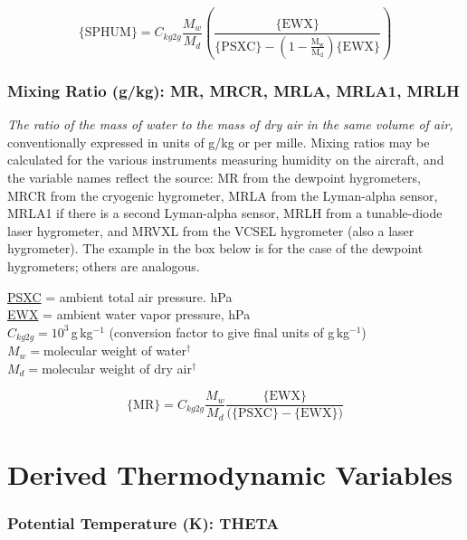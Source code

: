 \documentclass[
]{book}
\begin{document}
\begin{equation}
\mathrm{\{SPHUM\}} = C_{kg2g}\frac{M_{w}}{M_{d}}(\mathrm{\frac{\{EWX\}}{\mathrm{\{PSXC\}-(1-\frac{M_{w}}{M_{d}})\{\mathrm{EWX}\}}}})
\label{eq:SPHUM}
\end{equation}

\hypertarget{MR}{%
\subsubsection*{Mixing Ratio (g/kg): MR, MRCR, MRLA, MRLA1, MRLH}\label{MR}}

\emph{The ratio of the mass of water to the mass of dry air in the same volume of air,} conventionally expressed in units of g/kg or per mille. Mixing ratios may be calculated for the various instruments measuring humidity on the aircraft, and the variable names reflect the source: MR from the dewpoint hygrometers, MRCR from the cryogenic hygrometer, MRLA from the Lyman-alpha sensor, MRLA1 if there is a second Lyman-alpha sensor, MRLH from a tunable-diode laser hygrometer, and MRVXL from the VCSEL hygrometer (also a laser hygrometer). The example in the box below is for the case of the dewpoint hygrometers; others are analogous.

\protect\hyperlink{psx}{PSXC} = ambient total air pressure. hPa\\
\protect\hyperlink{ewx}{EWX} = ambient water vapor pressure, hPa\\
\(C_{kg2g}=10^{3}\,\)g\(\,\)kg\(^{-1}\) (conversion factor to give
final units of g\(\,\)kg\(^{-1}\))\\
\(M_{w}=\)molecular weight of water\(^{\dagger}\)\\
\(M_{d}=\)molecular weight of dry air\(^{\dagger}\)

\begin{equation}
\mathrm{\{MR\}}=C_{kg2g}\frac{M_{w}}{M_{d}}\frac{\mathrm{\{EWX\}}}{(\mathrm{\{PSXC\}-\{EWX\})}}
\label{eq:MR}
\end{equation}

\hypertarget{derived-thermodynamic-variables}{%
\section{Derived Thermodynamic Variables}\label{derived-thermodynamic-variables}}

\hypertarget{theta}{%
\subsubsection*{Potential Temperature (K): THETA}\label{theta}}
\end{document}

